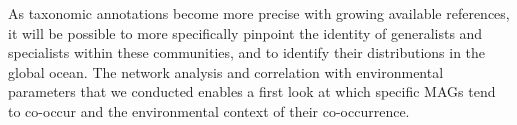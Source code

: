 \documentclass[12pt]{article}
\numberwithin{equation}{section}
\begin{document}
As taxonomic annotations become more precise with growing available references, it will be possible to more specifically pinpoint the identity of generalists and specialists within these communities, and to identify their distributions in the global ocean. The network analysis and correlation with environmental parameters that we conducted enables a first look at which specific MAGs tend to co-occur and the environmental context of their co-occurrence.



\end{document}
